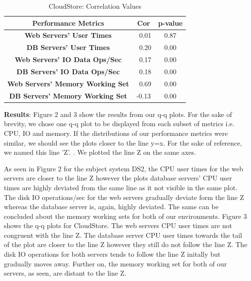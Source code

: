 \begin{table}[!htbp]
	\begin{center}
		\caption{CloudStore: Correlation Values}
		\label{resultRQ3}
		\begin{tabular}{c|cc}
			\toprule
			\textbf{Performance Metrics}   & \textbf{Cor}& \textbf{p-value}\\
			\midrule 
			\midrule 
			\textbf{Web Servers' User Times} & \ 0.01& 0.87\\
			\textbf{DB Servers' User Times} & \ 0.20 & 0.00\\
			\midrule 
			\textbf{Web Servers' IO Data Ops/Sec}   & \ 0.17& 0.00 \\
			\textbf{DB Servers' IO Data Ops/Sec} & \ 0.18& 0.00\\
			\midrule 
			\textbf{Web Servers' Memory Working Set} &\ 0.69& 0.00\\
			\textbf{DB Servers' Memory Working Set} & -0.13 & 0.00\\
			\bottomrule             
		\end{tabular}
	\end{center}
\end{table}



\textbf{Results}: Figure 2 and 3 show the results from our q-q plots. For the sake of brevity, we chose one q-q plot to be displayed from each subset of metrics i.e. CPU, IO and memory. If the distributions of our performance metrics were similar, we should see the plots closer to the line y=x. For the sake of reference, we named this line 'Z'. \cite{Cross_Validation}. We plotted the line Z on the same axes. 

As seen in Figure 2 for the subject system DS2, the CPU user times for the web servers are closer to the line Z however the plots database servers' CPU user times are highly deviated from the same line as it not visible in the same plot. The disk IO operations/sec for the web servers gradually deviate form the line Z whereas the database server is, again, highly deviated. The same can be concluded about the memory working sets for both of our environments.
Figure 3 shows the q-q plots for CloudStore. The web servers CPU user times are not congruent with the line Z. The database server CPU user times towards the tail of the plot are closer to the line Z however they still do not follow the line Z. The disk IO operations for both servers tends to follow the line Z initally but gradually moves away. Further on, the memory working set for both of our servers, as seen, are distant to the line Z.

